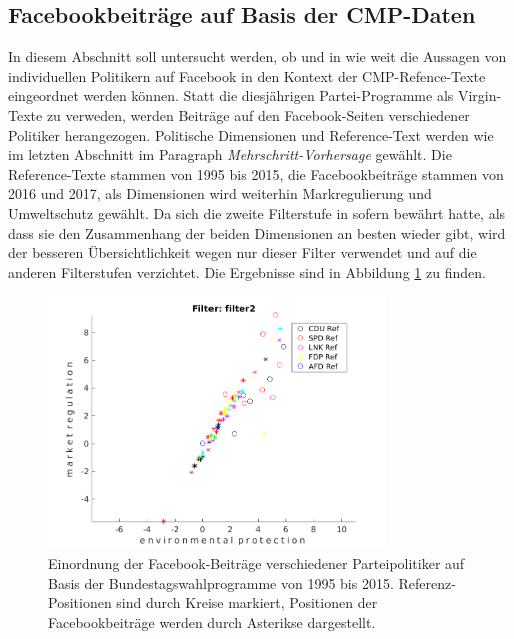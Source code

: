     \subsection{Facebookbeiträge auf Basis der CMP-Daten}
    In diesem Abschnitt soll untersucht werden, ob und in wie weit die Aussagen von individuellen Politikern auf Facebook in den Kontext der CMP-Refence-Texte eingeordnet werden können.
     Statt die diesjährigen Partei-Programme als Virgin-Texte zu verweden, werden Beiträge auf den Facebook-Seiten verschiedener Politiker herangezogen. Politische Dimensionen und Reference-Text werden wie im letzten Abschnitt im Paragraph \emph{Mehrschritt-Vorhersage} gewählt. 
     Die Reference-Texte stammen von 1995 bis 2015, die Facebookbeiträge stammen von 2016 und 2017, als Dimensionen wird weiterhin Markregulierung und Umweltschutz gewählt. Da sich die zweite Filterstufe in sofern bewährt hatte, als dass sie den Zusammenhang der beiden Dimensionen an besten wieder gibt, wird der besseren Übersichtlichkeit wegen nur dieser Filter verwendet und auf die anderen Filterstufen verzichtet. Die Ergebnisse sind in Abbildung \ref{fig:fbFilter2} zu finden.
     
     
    \begin{figure}
    
        \includegraphics[width = 0.8\textwidth]{images/fb_environmental_protection_market_regulation_filter2.png}
        \caption{Einordnung der Facebook-Beiträge verschiedener Parteipolitiker auf Basis der Bundestagswahlprogramme von 1995 bis 2015. Referenz-Positionen sind durch Kreise markiert, Positionen der Facebookbeiträge werden durch Asterikse dargestellt.
                 \label{fig:fbFilter2}}
    \end{figure}
     
